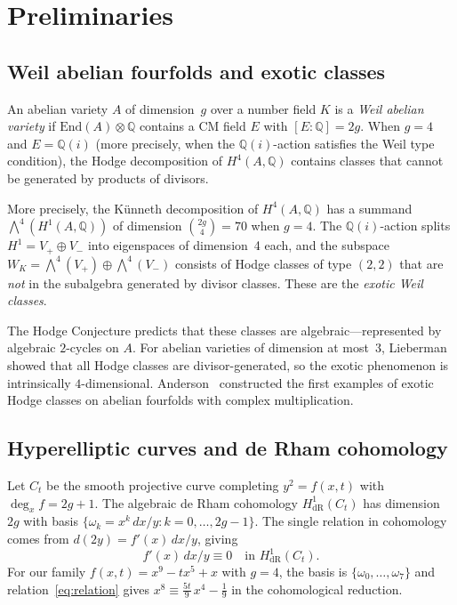 \documentclass[11pt]{article}
\theoremstyle{plain}
\theoremstyle{definition}
\theoremstyle{remark}
\newcommand{\Q}{\mathbb{Q}}
\newcommand{\End}{\mathrm{End}}
\begin{document}
\section{Preliminaries}

\subsection{Weil abelian fourfolds and exotic classes}

An abelian variety $A$ of dimension~$g$ over a number field $K$ is a
\emph{Weil abelian variety} if $\End(A) \otimes \Q$ contains a CM field
$E$ with $[E:\Q] = 2g$. When $g = 4$ and $E = \Q(i)$ (more precisely,
when the $\Q(i)$-action satisfies the Weil type condition), the Hodge
decomposition of $H^4(A, \Q)$ contains classes that cannot be generated
by products of divisors.

More precisely, the K\"unneth decomposition of $H^4(A, \Q)$ has a summand
$\bigwedge^4(H^1(A,\Q))$ of dimension $\binom{2g}{4} = 70$ when $g = 4$.
The $\Q(i)$-action splits $H^1 = V_+ \oplus V_-$ into eigenspaces of
dimension~4 each, and the subspace $W_K = \bigwedge^4(V_+) \oplus
\bigwedge^4(V_-)$ consists of Hodge classes of type $(2,2)$ that are
\emph{not} in the subalgebra generated by divisor classes. These are
the \emph{exotic Weil classes}.

The Hodge Conjecture predicts that these classes are algebraic---represented
by algebraic $2$-cycles on $A$. For abelian varieties of dimension at
most~3, Lieberman~\cite{Lieberman1968} showed that all Hodge classes are
divisor-generated, so the exotic phenomenon is intrinsically $4$-dimensional.
Anderson~\cite{Anderson1993} constructed the first examples of exotic Hodge
classes on abelian fourfolds with complex multiplication.

\subsection{Hyperelliptic curves and de Rham cohomology}

Let $C_t$ be the smooth projective curve completing $y^2 = f(x,t)$
with $\deg_x f = 2g+1$. The algebraic de Rham cohomology $H^1_{\mathrm{dR}}(C_t)$
has dimension $2g$ with basis $\{\omega_k = x^k\, dx/y : k = 0, \ldots, 2g-1\}$.
The single relation in cohomology comes from $d(2y) = f'(x)\, dx/y$, giving
\begin{equation}\label{eq:relation}
f'(x)\, dx/y \equiv 0 \quad \text{in } H^1_{\mathrm{dR}}(C_t).
\end{equation}
For our family $f(x,t) = x^9 - tx^5 + x$ with $g = 4$, the basis is
$\{\omega_0, \ldots, \omega_7\}$ and relation~\eqref{eq:relation} gives
$x^8 \equiv \tfrac{5t}{9}\, x^4 - \tfrac{1}{9}$ in the cohomological
reduction.
\end{document}

